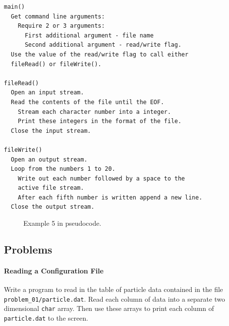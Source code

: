 \documentclass[11pt,a4paper]{scrartcl}
\begin{document}
\newsavebox{\fmbox}
\begin{lrbox}{\fmbox}
\begin{minipage}{13cm}
\begin{verbatim}
main() 
  Get command line arguments:
    Require 2 or 3 arguments: 
      First additional argument - file name
      Second additional argument - read/write flag.
  Use the value of the read/write flag to call either 
  fileRead() or fileWrite().

fileRead()
  Open an input stream.
  Read the contents of the file until the EOF.
    Stream each character number into a integer.
    Print these integers in the format of the file.
  Close the input stream.

fileWrite()
  Open an output stream.
  Loop from the numbers 1 to 20.
    Write out each number followed by a space to the 
    active file stream.
    After each fifth number is written append a new line.
  Close the output stream.
\end{verbatim}
\end{minipage}\end{lrbox}

\begin{figure}[h!!]
\begin{center}
\fbox{\usebox{\fmbox}}
\end{center}
\caption{Example 5 in pseudocode.
\label{figure:ex5_pseudocode}}
\end{figure}

\clearpage
\newpage


\subsection{Problems}
\paragraph{Reading a Configuration File}

Write a program to read in the table of particle data contained in the
file \texttt{problem\_01/particle.dat}.  Read each column of data into a
separate two dimensional \texttt{char} array.  Then use these arrays
to print each column of \texttt{particle.dat} to the screen.
\end{document}
